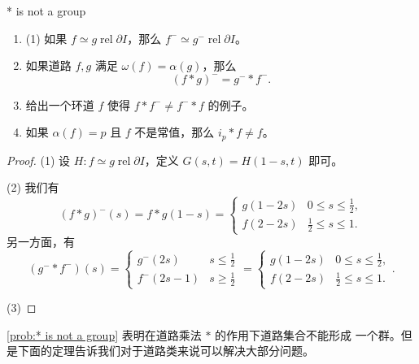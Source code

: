 \documentclass[fontset=none]{Notes}
\DeclareMathOperator\rel{rel}
\newcommand{\partI}{\partial I}
\newcommand{\relhomo}{\rel\partI}
\begin{document}
\begin{problem}{}{* is not a group}
  \begin{enumerate}
    \item (1) 如果 $f\simeq g\relhomo$，那么
    $f^-\simeq g^-\relhomo$。
    \item 如果道路 $f,g$ 满足 $\omega(f)=\alpha(g)$，那么
    \[
      (f*g)^{-}=g^-*f^-.
    \]
    \item 给出一个环道 $f$ 使得 $f*f^-\neq f^-*f$ 的例子。
    \item 如果 $\alpha(f)=p$ 且 $f$ 不是常值，那么 $i_p*f\neq f$。
  \end{enumerate}
\end{problem}
\begin{proof}
  (1) 设 $H:f\simeq g\relhomo$，定义 
  $ G(s,t)=H(1-s,t) $ 即可。

  (2) 我们有
  \[
    (f*g)^-(s)=f*g(1-s)=\begin{cases}
      g(1-2s) & 0\leq s\leq \frac{1}{2},\\
      f(2-2s) & \frac{1}{2}\leq s\leq 1.
    \end{cases}
  \]
  另一方面，有
  \[
    (g^-*f^-)(s)=\begin{cases}
      g^-(2s) & s\leq \frac{1}{2}\\
      f^-(2s-1) & s\geq \frac{1}{2}
    \end{cases}=\begin{cases}
      g(1-2s) & 0\leq s\leq \frac{1}{2},\\
      f(2-2s) & \frac{1}{2}\leq s\leq 1.
    \end{cases}.
  \]

  (3) 
\end{proof}

\ref{prob:* is not a group} 表明在道路乘法 $*$ 的作用下道路集合不能形成
一个群。但是下面的定理告诉我们对于道路类来说可以解决大部分问题。
\end{document}

